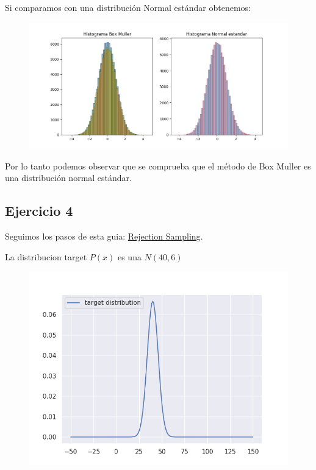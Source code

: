 \documentclass[11pt,a4paper]{article}
\begin{document}
		Si comparamos con una distribución Normal estándar obtenemos:
		\begin{figure}[H]
  			\centering
    			\includegraphics[width=20cm]{imagenes/histogramasEjer3}
		\end{figure}
		
		Por lo tanto podemos observar que se comprueba que el método de Box Muller es una distribución normal estándar.



	\subsection{Ejercicio 4}

	Seguimos los pasos de esta guia: \href{https://wiseodd.github.io/techblog/2015/10/21/rejection-sampling/}{ Rejection Sampling}.

	La distribucion target $P(x)$ es una $N(40,6)$
	\begin{figure}[H]
  			\centering
    			\includegraphics[width=14cm]{imagenes/target}
	\end{figure}
\end{document}

